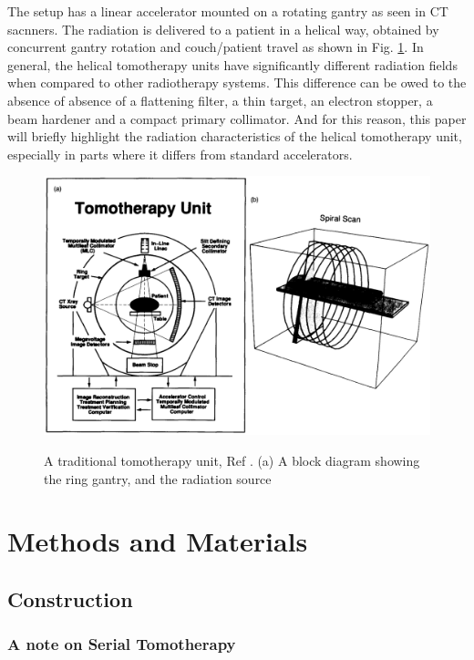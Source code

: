 \documentclass[12pt,journal,compsoc]{IEEEtran} %
\begin{document}
  
  The setup has a linear accelerator mounted on a rotating gantry as seen in CT 
  sacnners. The radiation is delivered to a patient in a helical way, obtained 
  by concurrent gantry rotation and couch/patient travel as shown in Fig. 
  \ref{fig1}. In general, the helical tomotherapy units have significantly 
  different radiation fields when compared to other radiotherapy systems. This 
  difference can be owed to the absence of absence of a flattening filter, a 
  thin target, an electron stopper, a beam hardener and a compact primary 
  collimator. And for this reason, this paper will briefly highlight the 
  radiation characteristics of the helical tomotherapy unit, especially in 
  parts where it differs from standard accelerators.
  \begin{figure}[t!]
  	\includegraphics[width=\linewidth]{fig1}
  \label{fig1}
  \caption{A traditional tomotherapy unit, Ref \cite{Mackie1993}. (a) A block 
  diagram showing the ring gantry, and the radiation source}
  \end{figure}
  
  \section{Methods and Materials}
  \subsection{Construction}
  \subsubsection{A note on Serial Tomotherapy}
\end{document}
